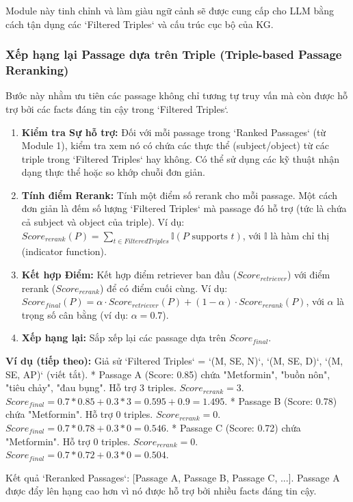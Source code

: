 \documentclass[../main.tex]{subfiles}
\begin{document}
Module này tinh chỉnh và làm giàu ngữ cảnh sẽ được cung cấp cho LLM bằng cách tận dụng các `Filtered Triples` và cấu trúc cục bộ của KG.

\subsubsection{Xếp hạng lại Passage dựa trên Triple (Triple-based Passage Reranking)}

Bước này nhằm ưu tiên các passage không chỉ tương tự truy vấn mà còn được hỗ trợ bởi các facts đáng tin cậy trong `Filtered Triples`.

\begin{enumerate}
    \item \textbf{Kiểm tra Sự hỗ trợ:} Đối với mỗi passage trong `Ranked Passages` (từ Module 1), kiểm tra xem nó có chứa các thực thể (subject/object) từ các triple trong `Filtered Triples` hay không. Có thể sử dụng các kỹ thuật nhận dạng thực thể hoặc so khớp chuỗi đơn giản.
    \item \textbf{Tính điểm Rerank:} Tính một điểm số rerank cho mỗi passage. Một cách đơn giản là đếm số lượng `Filtered Triples` mà passage đó hỗ trợ (tức là chứa cả subject và object của triple). Ví dụ: $Score_{rerank}(P) = \sum_{t \in FilteredTriples} \mathbb{I}(P \text{ supports } t)$, với $\mathbb{I}$ là hàm chỉ thị (indicator function).
    \item \textbf{Kết hợp Điểm:} Kết hợp điểm retriever ban đầu ($Score_{retriever}$) với điểm rerank ($Score_{rerank}$) để có điểm cuối cùng. Ví dụ: $Score_{final}(P) = \alpha \cdot Score_{retriever}(P) + (1-\alpha) \cdot Score_{rerank}(P)$, với $\alpha$ là trọng số cân bằng (ví dụ: $\alpha=0.7$).
    \item \textbf{Xếp hạng lại:} Sắp xếp lại các passage dựa trên $Score_{final}$.
\end{enumerate}

\textbf{Ví dụ (tiếp theo):}
Giả sử `Filtered Triples` = {`(M, SE, N)`, `(M, SE, D)`, `(M, SE, AP)`} (viết tắt).
*   Passage A (Score: 0.85) chứa "Metformin", "buồn nôn", "tiêu chảy", "đau bụng". Hỗ trợ 3 triples. $Score_{rerank}=3$. $Score_{final} = 0.7*0.85 + 0.3*3 = 0.595 + 0.9 = 1.495$.
*   Passage B (Score: 0.78) chứa "Metformin". Hỗ trợ 0 triples. $Score_{rerank}=0$. $Score_{final} = 0.7*0.78 + 0.3*0 = 0.546$.
*   Passage C (Score: 0.72) chứa "Metformin". Hỗ trợ 0 triples. $Score_{rerank}=0$. $Score_{final} = 0.7*0.72 + 0.3*0 = 0.504$.

Kết quả `Reranked Passages`: [Passage A, Passage B, Passage C, ...]. Passage A được đẩy lên hạng cao hơn vì nó được hỗ trợ bởi nhiều facts đáng tin cậy.
\end{document}
